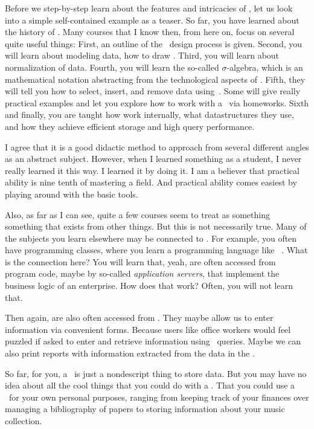 Before we step-by-step learn about the features and intricacies of , let us look into a simple self-contained example as a teaser.
So far, you have learned about the history of .
Many courses that I know then, from here on, focus on several quite useful things:
First, an outline of the \db\ design process is given.
Second, you will learn about modeling data, how to draw .
Third, you will learn about normalization of data.
Fourth, you will learn the so-called $\sigma$\nobreakdashes-algebra, which is an mathematical notation abstracting from the technological aspects of .
Fifth, they will tell you how to select, insert, and remove data using~\sql.
Some will give really practical examples and let you explore how to work with a \db\ via homeworks.
Sixth and finally, you are taught how  work internally, what datastructures they use, and how they achieve efficient storage and high query performance.

I agree that it is a good didactic method to approach  from several different angles as an abstract subject.
However, when I learned something as a student, I never really learned it this way.
I learned it by doing it.
I am a believer that practical ability is nine tenth of mastering a field.
And practical ability comes easiest by playing around with the basic tools.

Also, as far as I can see, quite a few courses seem to treat  as something  something that exists  from other things.
But this is not necessarily true.
Many of the subjects you learn elsewhere may be connected to .
For example, you often have programming classes, where you learn a programming language like \python~\cite{programmingWithPython}.
What is the connection here?
You will learn that, yeah,  are often accessed from program code, maybe by so-called \emph{application servers}, that implement the business logic of an enterprise.
How does that work?
Often, you will not learn that.

Then again,  are also often accessed from .
They maybe allow us to enter information via convenient forms.
Because users like office workers would feel puzzled if asked to enter and retrieve information using \sql\ queries.
Maybe we can also print reports with information extracted from the data in the \db.

So far, for you, a \db\ is just a nondescript thing to store data.
But you may have no idea about all the cool things that you could do with a \db.
That you could use a \db\ for your own personal purposes, ranging from keeping track of your finances over managing a bibliography of papers to storing information about your music collection.

